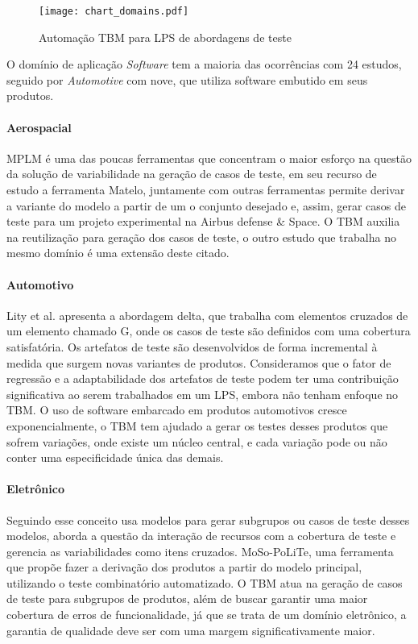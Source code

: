\begin{figure}[!ht]
	\centering	
	\texttt{[image: chart\_domains.pdf]}
	\caption{Automação TBM para LPS de abordagens de teste}
	\label{fig:chart_domains}
\end{figure}

O domínio de aplicação \textit{Software} tem a maioria das ocorrências com 24 estudos, seguido por \textit{Automotive} com nove, que utiliza software embutido em seus produtos.

\paragraph{\textbf{Aerospacial}}

MPLM é uma das poucas ferramentas que concentram o maior esforço na questão da solução de variabilidade na geração de casos de teste, \cite{SamihBogusch2014} em seu recurso de estudo a ferramenta Matelo, juntamente com outras ferramentas permite derivar a variante do modelo a partir de um o conjunto desejado e, assim, gerar casos de teste para um projeto experimental na Airbus defense \& Space. O TBM auxilia na reutilização para geração dos casos de teste, o outro estudo que trabalha no mesmo domínio é uma extensão deste citado.

\paragraph{\textbf{Automotivo}}

Lity et al. \cite{Lity_et_al2012} apresenta a abordagem delta, que trabalha com elementos cruzados de um elemento chamado G, onde os casos de teste são definidos com uma cobertura satisfatória. Os artefatos de teste são desenvolvidos de forma incremental à medida que surgem novas variantes de produtos. Consideramos que o fator de regressão e a adaptabilidade dos artefatos de teste podem ter uma contribuição significativa ao serem trabalhados em um LPS, embora não tenham enfoque no TBM. O uso de software embarcado em produtos automotivos cresce exponencialmente, o TBM tem ajudado a gerar os testes desses produtos que sofrem variações, onde existe um núcleo central, e cada variação pode ou não conter uma especificidade única das demais.

\paragraph{\textbf{Eletrônico}}

Seguindo esse conceito \cite{steffens2012industrial} usa modelos para gerar subgrupos ou casos de teste desses modelos, aborda a questão da interação de recursos com a cobertura de teste e gerencia as variabilidades como itens cruzados. MoSo-PoLiTe, uma ferramenta que propõe fazer a derivação dos produtos a partir do modelo principal, utilizando o teste combinatório automatizado. O TBM atua na geração de casos de teste para subgrupos de produtos, além de buscar garantir uma maior cobertura de erros de funcionalidade, já que se trata de um domínio eletrônico, a garantia de qualidade deve ser com uma margem significativamente maior.

